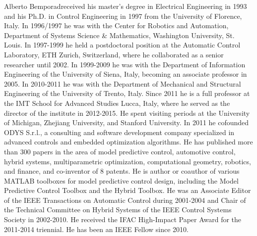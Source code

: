 \documentclass[journal]{IEEEtran}
\begin{document}
\begin{IEEEbiography}{Alberto Bemporad}received his master's degree in Electrical Engineering in 1993 and his Ph.D. in Control Engineering in 1997 from the University of Florence, Italy. In 1996/1997 he was with the Center for Robotics and Automation, Department of Systems Science \& Mathematics, Washington University, St. Louis. In 1997-1999 he held a postdoctoral position at the Automatic Control Laboratory, ETH Zurich, Switzerland, where he collaborated as a senior researcher until 2002. In 1999-2009 he was with the Department of Information Engineering of the University of Siena, Italy, becoming an associate professor in 2005. In 2010-2011 he was with the Department of Mechanical and Structural Engineering of the University of Trento, Italy. Since 2011 he is a full professor at the IMT School for Advanced Studies Lucca, Italy, where he served as the director of the institute in 2012-2015. He spent visiting periods at the University of Michigan, Zhejiang University, and Stanford University. In 2011 he cofounded ODYS S.r.l., a consulting and software development company specialized in advanced controls and embedded optimization algorithms. He has published more than 300 papers in the area of model predictive control, automotive control, hybrid systems, multiparametric optimization, computational geometry, robotics, and finance, and co-inventor of 8 patents. He is author or coauthor of various MATLAB toolboxes for model predictive control design, including the Model Predictive Control Toolbox and the Hybrid Toolbox. He was an Associate Editor of the IEEE Transactions on Automatic Control during 2001-2004 and Chair of the Technical Committee on Hybrid Systems of the IEEE Control Systems Society in 2002-2010. He received the IFAC High-Impact Paper Award for the 2011-2014 triennial. He has been an IEEE Fellow since 2010.
\end{IEEEbiography}







\end{document}
